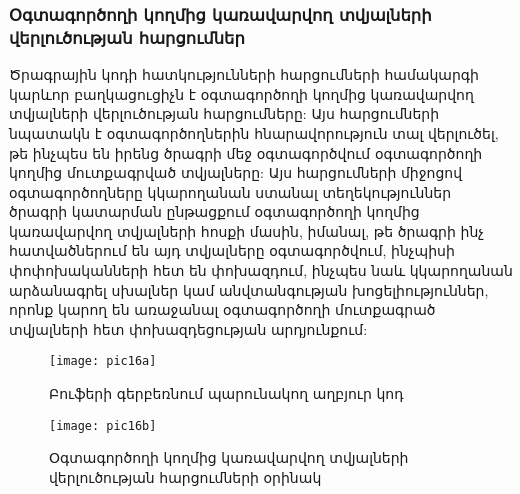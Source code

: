 \subsubsection*{Օգտագործողի կողմից կառավարվող տվյալների վերլուծության հարցումներ}\label{subsubsec:taintAnalisys}
Ծրագրային կոդի հատկությունների հարցումների համակարգի կարևոր բաղկացուցիչն է օգտագործողի կողմից կառավարվող տվյալների վերլուծության հարցումները:
Այս հարցումների նպատակն է օգտագործողներին հնարավորություն տալ վերլուծել, թե ինչպես են իրենց ծրագրի մեջ օգտագործվում
օգտագործողի կողմից մուտքագրված տվյալները:
Այս հարցումների միջոցով օգտագործողները կկարողանան ստանալ տեղեկություններ ծրագրի կատարման ընթացքում օգտագործողի կողմից
կառավարվող տվյալների հոսքի մասին, իմանալ, թե ծրագրի ինչ հատվածներում են այդ տվյալները օգտագործվում, ինչպիսի փոփոխականների
հետ են փոխազդում, ինչպես նաև կկարողանան արձանագրել սխալներ կամ անվտանգության խոցելիություններ, որոնք կարող են առաջանալ օգտագործողի
մուտքագրած տվյալների հետ փոխազդեցության արդյունքում:

\begin{figure}[h]
    \centering
    \texttt{[image: pic16a]}
    \caption{Բուֆերի գերբեռնում պարունակող աղբյուր կոդ}
    \label{fig:figure16a}
\end{figure}

\begin{figure}[h]
    \centering
    \texttt{[image: pic16b]}
    \caption{Օգտագործողի կողմից կառավարվող տվյալների վերլուծության հարցումների օրինակ}
    \label{fig:figure16b}
\end{figure}
